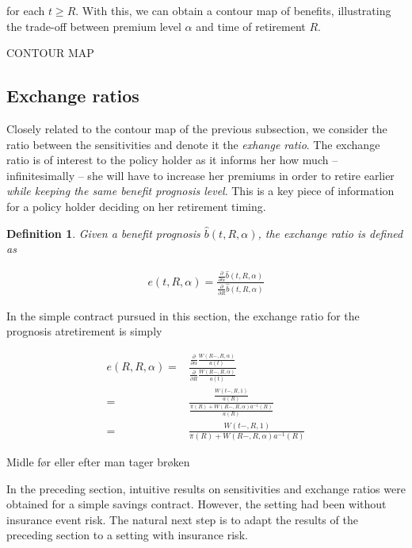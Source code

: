 \documentclass{book}
\newcommand{\1}[1]{\mathbbm{1}_{\left\lbrace #1 \right\rbrace}}
\theoremstyle{break}
\newtheorem{definition}{Definition}%
\theoremstyle{remark}
\newenvironment{remark}
  {\pushQED{\qed}\renewcommand{\qedsymbol}{\scalebox{1.4}{$\circ$}}\remarkx}
  {\popQED\endremarkx}
\numberwithin{equation}{section}
\begin{document}
for each $t \geq R$. With this, we can obtain a contour map of benefits, illustrating the trade-off between premium level $\alpha$ and time of retirement $R$.

CONTOUR MAP

\subsection{Exchange ratios}

Closely related to the contour map of the previous subsection, we consider the ratio between the sensitivities and denote it the \textit{exhange ratio}. The exchange ratio is of interest to the policy holder as it informs her how much -- infinitesimally -- she will have to increase her premiums in order to retire earlier \textit{while keeping the same benefit prognosis level}. This is a key piece of information for a policy holder deciding on her retirement timing.

\begin{definition}
	Given a benefit prognosis $\hat{b}(t,R,\alpha)$, the exchange ratio is defined as
	
\begin{align*}
	e(t,R,\alpha) = \frac{\frac{\partial}{\partial \alpha }\hat{b}(t,R,\alpha)}{\frac{\partial}{\partial R }\hat{b}(t,R,\alpha)}
\end{align*}
\end{definition}

In the simple contract pursued in this section, the exchange ratio for the prognosis atretirement is simply

\begin{align*}
	e(R,R,\alpha) =& \frac{\frac{\partial}{\partial \alpha }\frac{W(R-,R,\alpha)}{a(t)}}{\frac{\partial}{\partial R }\frac{W(R-,R,\alpha)}{a(t)}} \\
	=& \frac{\frac{W(t-,R,1)}{a(R)}}{\frac{\pi (R) + W(R-,R,\alpha) a^{-1}(R)}{a(R)}} \\
	=& \frac{W(t-,R,1)}{\pi (R) + W(R-,R,\alpha) a^{-1}(R)}
\end{align*}   

\begin{remark}
	Midle før eller efter man tager brøken
\end{remark}

In the preceding section, intuitive results on sensitivities and exchange ratios were obtained for a simple savings contract. However, the setting had been without insurance event risk. The natural next step is to adapt the results of the preceding section to a setting with insurance risk.
\end{document}
